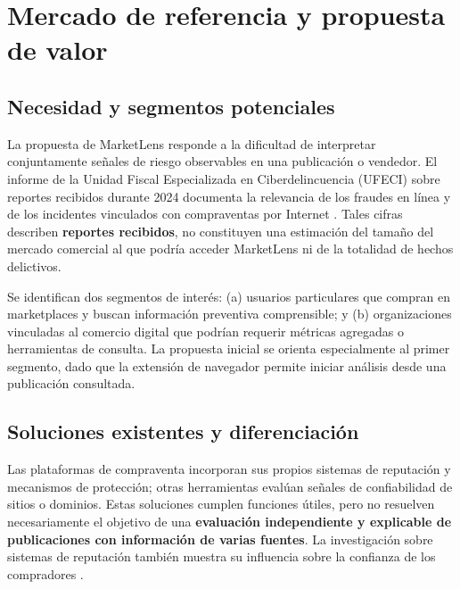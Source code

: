 \section{Mercado de referencia y propuesta de valor}\label{sec:ml-mercado}

\subsection{Necesidad y segmentos potenciales}

La propuesta de MarketLens responde a la dificultad de interpretar conjuntamente señales de riesgo observables en una publicación o vendedor. El informe de la Unidad Fiscal Especializada en Ciberdelincuencia (UFECI) sobre reportes recibidos durante 2024 documenta la relevancia de los fraudes en línea y de los incidentes vinculados con compraventas por Internet \citep{ml-ufeci-2025}. Tales cifras describen \textbf{reportes recibidos}, no constituyen una estimación del tamaño del mercado comercial al que podría acceder MarketLens ni de la totalidad de hechos delictivos.

Se identifican dos segmentos de interés: (a) usuarios particulares que compran en marketplaces y buscan información preventiva comprensible; y (b) organizaciones vinculadas al comercio digital que podrían requerir métricas agregadas o herramientas de consulta. La propuesta inicial se orienta especialmente al primer segmento, dado que la extensión de navegador permite iniciar análisis desde una publicación consultada.

\subsection{Soluciones existentes y diferenciación}

Las plataformas de compraventa incorporan sus propios sistemas de reputación y mecanismos de protección; otras herramientas evalúan señales de confiabilidad de sitios o dominios. Estas soluciones cumplen funciones útiles, pero no resuelven necesariamente el objetivo de una \textbf{evaluación independiente y explicable de publicaciones con información de varias fuentes}. La investigación sobre sistemas de reputación también muestra su influencia sobre la confianza de los compradores \citep{ml-tadelis-2016,ml-resnick-2006}.

